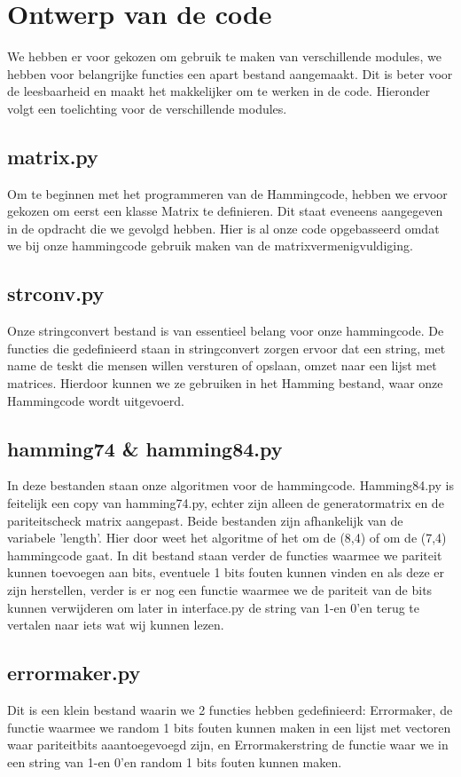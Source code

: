 \documentclass[a4paper]{article}
\begin{document}
\section{Ontwerp van de code}
We hebben er voor gekozen om gebruik te maken van verschillende modules, we hebben voor belangrijke functies een apart bestand aangemaakt. Dit is beter voor de leesbaarheid en maakt het makkelijker om te werken in de code. Hieronder volgt een toelichting voor de verschillende modules.

\subsection{matrix.py}
	Om te beginnen met het programmeren van de Hammingcode, hebben we ervoor gekozen om eerst een klasse Matrix te definieren. Dit staat eveneens aangegeven in de opdracht die we gevolgd hebben. Hier is al onze code opgebasseerd omdat we bij onze hammingcode gebruik maken van de matrixvermenigvuldiging.

\subsection{strconv.py}
	Onze stringconvert bestand is van essentieel belang voor onze hammingcode. De functies die gedefinieerd staan in stringconvert zorgen ervoor dat een string, met name de teskt die mensen willen versturen of opslaan, omzet naar een lijst met matrices. Hierdoor kunnen we ze gebruiken in het Hamming bestand, waar onze Hammingcode wordt uitgevoerd.

\subsection{hamming74 \& hamming84.py}
	In deze bestanden staan onze algoritmen voor de hammingcode. Hamming84.py is feitelijk een copy van hamming74.py, echter zijn alleen de generatormatrix en de pariteitscheck matrix aangepast. Beide bestanden zijn afhankelijk van de variabele 'length'. Hier door weet het algoritme of het om de (8,4) of om de (7,4) hammingcode gaat. In dit bestand staan verder de functies waarmee we pariteit kunnen toevoegen aan bits, eventuele 1 bits fouten kunnen vinden en als deze er zijn herstellen, verder is er nog een functie waarmee we de pariteit van de bits kunnen verwijderen om later in interface.py de string van 1-en 0'en terug te vertalen naar iets wat wij kunnen lezen.

\subsection{errormaker.py}
	Dit is een klein bestand waarin we 2 functies hebben gedefinieerd: Errormaker, de functie waarmee we random 1 bits fouten kunnen maken in een lijst met vectoren waar pariteitbits aaantoegevoegd zijn, en Errormakerstring de functie waar we in een string van 1-en 0'en random 1 bits fouten kunnen maken.	
\end{document}
